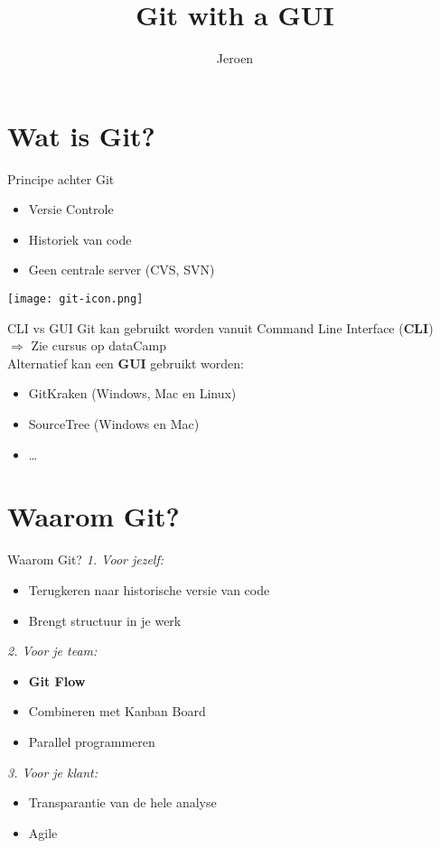 \documentclass[11pt]{beamer}
\author{Jeroen}
\title{Git with a GUI}
\begin{document}
\begin{frame}
\titlepage
\end{frame}


\section{Wat is Git?}
\begin{frame}{Principe achter Git}
\begin{itemize}
\item Versie Controle
\item Historiek van code
\item Geen centrale server (CVS, SVN)
\end{itemize}
\hspace{200pt}
\texttt{[image: git-icon.png]}
\end{frame}

\begin{frame}{CLI vs GUI}
Git kan gebruikt worden vanuit Command Line Interface (\textbf{CLI})\\
$\Rightarrow$ Zie cursus op dataCamp\\
\vspace{12pt}
Alternatief kan een \textbf{GUI} gebruikt worden:
\begin{itemize}
\item GitKraken (Windows, Mac en Linux)
\item SourceTree (Windows en Mac)
\item \dots
\end{itemize}
\end{frame}

\section{Waarom Git?}
\begin{frame}{Waarom Git?}
\emph{1. Voor jezelf:}
\begin{itemize}
\item Terugkeren naar historische versie van code
\item Brengt structuur in je werk
\end{itemize}
\emph{2. Voor je team:}
\begin{itemize}
\item \textbf{Git Flow}
\item Combineren met Kanban Board
\item Parallel programmeren
\end{itemize}
\emph{3. Voor je klant:}
\begin{itemize}
\item Transparantie van de hele analyse
\item Agile
\end{itemize}
\end{frame}
\end{document}
